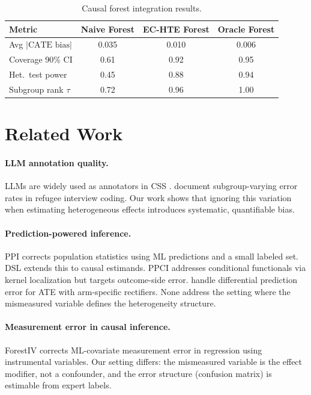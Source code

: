 \documentclass[11pt,a4paper]{article}
\begin{document}
\begin{table}[t]
\centering
\small
\caption{Causal forest integration results.}
\label{tab:forest}
\begin{tabular}{l ccc}
\toprule
Metric & Naive Forest & EC-HTE Forest & Oracle Forest \\
\midrule
Avg $|\text{CATE bias}|$  & 0.035 & 0.010 & 0.006 \\
Coverage 90\% CI          & 0.61  & 0.92  & 0.95 \\
Het.\ test power          & 0.45  & 0.88  & 0.94 \\
Subgroup rank $\tau$      & 0.72  & 0.96  & 1.00 \\
\bottomrule
\end{tabular}
\end{table}

\section{Related Work}
\label{sec:related}

\paragraph{LLM annotation quality.}
LLMs are widely used as annotators in CSS \citep{gilardi2023chatgpt,ziems2024llm}.
\citet{ashwin2025llm} document subgroup-varying error rates in refugee interview coding.
Our work shows that ignoring this variation when estimating heterogeneous effects introduces systematic, quantifiable bias.

\paragraph{Prediction-powered inference.}
PPI \citep{angelopoulos2023ppi} corrects population statistics using ML predictions and a small labeled set.
DSL \citep{egami2024dsl} extends this to causal estimands.
PPCI \citep{sui2026ppci} addresses conditional functionals via kernel localization but targets outcome-side error.
\citet{mozer2026arm} handle differential prediction error for ATE with arm-specific rectifiers.
None address the setting where the mismeasured variable defines the heterogeneity structure.

\paragraph{Measurement error in causal inference.}
ForestIV \citep{bu2023forestiv} corrects ML-covariate measurement error in regression using instrumental variables.
Our setting differs: the mismeasured variable is the effect modifier, not a confounder, and the error structure (confusion matrix) is estimable from expert labels.
\end{document}
